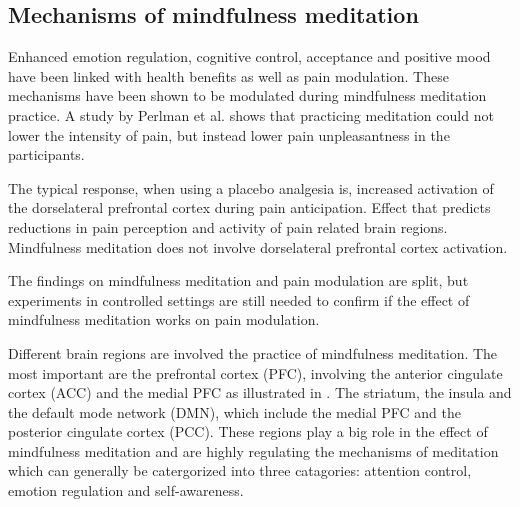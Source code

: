 


\subsection{Mechanisms of mindfulness meditation}

Enhanced emotion regulation, cognitive control, acceptance and positive mood have been linked with health benefits as well as pain modulation. These mechanisms have been shown to be modulated during mindfulness meditation practice. A study by Perlman et al. \cite{Perlman2010} shows that practicing meditation could not lower the intensity of pain, but instead lower pain unpleasantness in the participants. \cite{Zeidan2012, Perlman2010}

The typical response, when using a placebo analgesia is, increased activation of the dorselateral prefrontal cortex during pain anticipation. Effect that predicts reductions in pain perception and activity of pain related brain regions. Mindfulness meditation does not involve dorselateral prefrontal cortex activation. \cite{Zeidan2012}

The findings on mindfulness meditation and pain modulation are split, but experiments in controlled settings are still needed to confirm if the effect of mindfulness meditation works on pain modulation. \cite{Zeidan2012, Perlman2010}



Different brain regions are involved the practice of mindfulness meditation. The most important are the prefrontal cortex (PFC), involving the anterior cingulate cortex (ACC) and the medial PFC as illustrated in . The striatum, the insula and the default mode network (DMN), which include the medial PFC and the posterior cingulate cortex (PCC). These regions play a big role in the effect of mindfulness meditation and are highly regulating the mechanisms of meditation which can generally be catergorized into three catagories: attention control, emotion regulation and self-awareness. 

